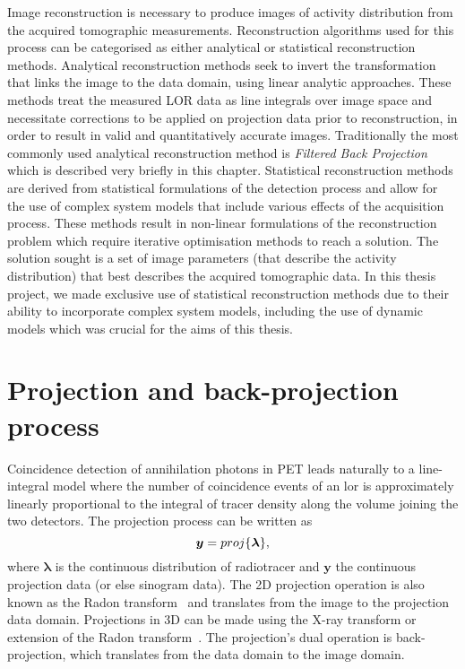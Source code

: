 Image reconstruction is necessary to produce images of activity distribution from the acquired tomographic measurements. Reconstruction algorithms used for this process can be categorised as either analytical or statistical reconstruction methods.  
Analytical reconstruction methods seek to invert the transformation that links the image to the data domain, using linear analytic approaches. These methods treat the measured LOR data as line integrals over image space and necessitate corrections to be applied on projection data prior to reconstruction, in order to result in valid and quantitatively accurate images. Traditionally the most commonly used analytical reconstruction method is \textit{Filtered Back Projection} which is described very briefly in this chapter. 
Statistical reconstruction methods are derived from statistical formulations of the detection process and allow for the use of complex system models that include various effects of the acquisition process. These methods result in non-linear formulations of the reconstruction problem which require iterative optimisation methods to reach a solution. The solution sought is a set of image parameters (that describe the activity distribution) that best describes the acquired tomographic data. 
In this thesis project, we made exclusive use of statistical reconstruction methods due to their ability to incorporate complex system models, including the use of dynamic models which was crucial for the aims of this thesis.

\section{Projection and back-projection process}
Coincidence detection of annihilation photons in PET leads naturally to a line-integral model where the number of coincidence events of an \gls{lor} is approximately linearly proportional to the integral of tracer density along the volume joining the two detectors. 
The projection process can be written as
\begin{equation}
   \bm y = proj\{\bm{\lambda}\}  \\, 
  \label{eqn:Radon}
\end{equation}
where $\bm{\lambda}$ is the continuous distribution of radiotracer and $\bm{y}$ the continuous projection data (or else sinogram data).
The 2D projection operation is also known as the Radon transform~\cite{radon1917,Radon1986} and translates from the image to the projection data domain. Projections in 3D can be made using the X-ray transform or extension of the Radon transform~\cite{Natterer1986}. 
The projection's dual operation is back-projection, which translates from the data domain to the image domain.
%
